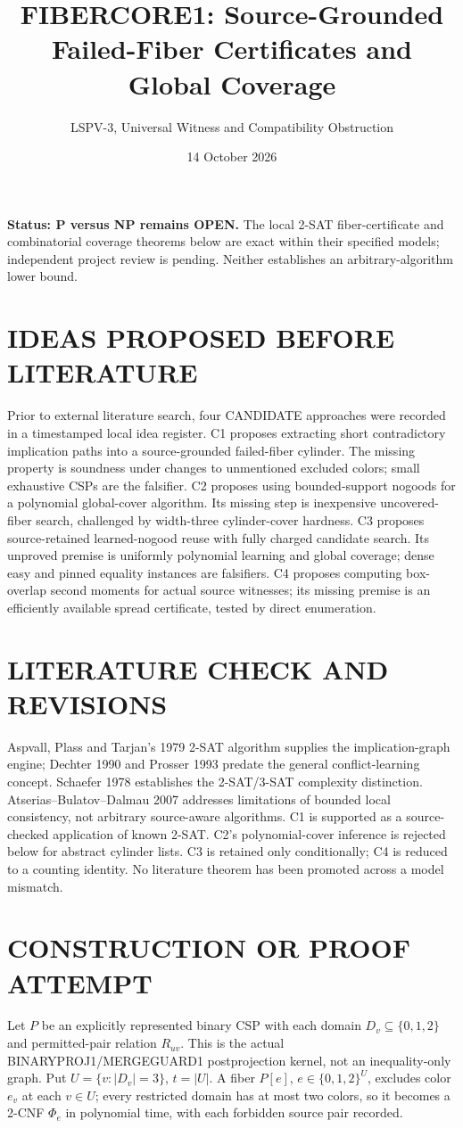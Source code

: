 \documentclass[11pt]{article}
\title{FIBERCORE1: Source-Grounded Failed-Fiber Certificates and Global Coverage}
\author{LSPV-3, Universal Witness and Compatibility Obstruction}
\date{14 October 2026}
\begin{document}
\maketitle
\noindent\textbf{Status: P versus NP remains OPEN.} The local 2-SAT fiber-certificate and combinatorial coverage theorems below are exact within their specified models; independent project review is pending. Neither establishes an arbitrary-algorithm lower bound.

\section{IDEAS PROPOSED BEFORE LITERATURE}
Prior to external literature search, four CANDIDATE approaches were recorded in a timestamped local idea register. C1 proposes extracting short contradictory implication paths into a source-grounded failed-fiber cylinder. The missing property is soundness under changes to unmentioned excluded colors; small exhaustive CSPs are the falsifier. C2 proposes using bounded-support nogoods for a polynomial global-cover algorithm. Its missing step is inexpensive uncovered-fiber search, challenged by width-three cylinder-cover hardness. C3 proposes source-retained learned-nogood reuse with fully charged candidate search. Its unproved premise is uniformly polynomial learning and global coverage; dense easy and pinned equality instances are falsifiers. C4 proposes computing box-overlap second moments for actual source witnesses; its missing premise is an efficiently available spread certificate, tested by direct enumeration.

\section{LITERATURE CHECK AND REVISIONS}
Aspvall, Plass and Tarjan's 1979 2-SAT algorithm supplies the implication-graph engine; Dechter 1990 and Prosser 1993 predate the general conflict-learning concept. Schaefer 1978 establishes the 2-SAT/3-SAT complexity distinction. Atserias--Bulatov--Dalmau 2007 addresses limitations of bounded local consistency, not arbitrary source-aware algorithms. C1 is supported as a source-checked application of known 2-SAT. C2's polynomial-cover inference is rejected below for abstract cylinder lists. C3 is retained only conditionally; C4 is reduced to a counting identity. No literature theorem has been promoted across a model mismatch.

\section{CONSTRUCTION OR PROOF ATTEMPT}
Let $P$ be an explicitly represented binary CSP with each domain $D_v\subseteq\{0,1,2\}$ and permitted-pair relation $R_{uv}$. This is the actual BINARYPROJ1/MERGEGUARD1 postprojection kernel, not an inequality-only graph. Put $U=\{v:|D_v|=3\}$, $t=|U|$. A fiber $P[e]$, $e\in\{0,1,2\}^{U}$, excludes color $e_v$ at each $v\in U$; every restricted domain has at most two colors, so it becomes a 2-CNF $\Phi_e$ in polynomial time, with each forbidden source pair recorded.
\end{document}
